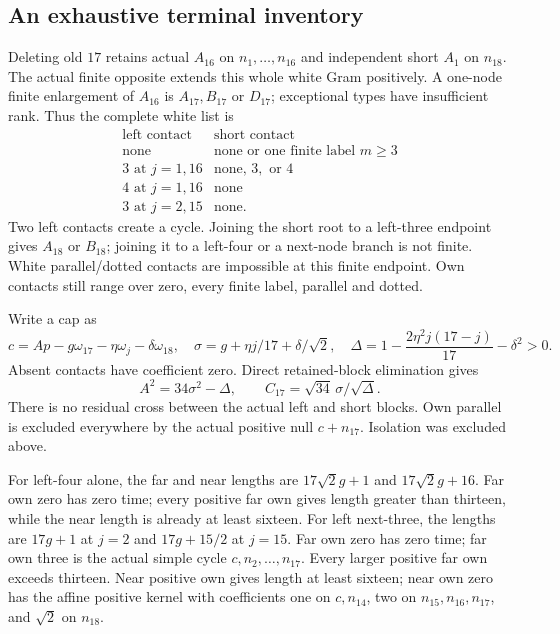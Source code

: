 \documentclass[11pt]{article}
\theoremstyle{definition}
\theoremstyle{remark}
\begin{document}
\subsection{An exhaustive terminal inventory}
\label{app:B18inventory}
Deleting old \(17\) retains actual \(A_{16}\) on
\(n_1,\ldots,n_{16}\) and independent short \(A_1\) on \(n_{18}\).
The actual finite opposite extends this whole white Gram positively.
A one-node finite enlargement of \(A_{16}\) is \(A_{17},B_{17}\)
or \(D_{17}\); exceptional types have insufficient rank.
Thus the complete white list is
\[
\begin{array}{c|l}
\text{left contact}&\text{short contact}\\ \hline
\text{none}&\text{none or one finite label }m\geq3\\
3\text{ at }j=1,16&\text{none, }3,\text{ or }4\\
4\text{ at }j=1,16&\text{none}\\
3\text{ at }j=2,15&\text{none}.
\end{array}
\]
Two left contacts create a cycle. Joining the short root to a
left-three endpoint gives \(A_{18}\) or \(B_{18}\); joining it
to a left-four or a next-node branch is not finite.
White parallel/dotted contacts are impossible at this finite endpoint.
Own contacts still range over zero, every finite label, parallel
and dotted.

Write a cap as
\[
 c=A p-g\omega_{17}-\eta\omega_j-\delta\omega_{18},
\quad
 \sigma=g+\eta j/17+\delta/\sqrt2,\quad
 \Delta=1-\frac{2\eta^2j(17-j)}{17}-\delta^2>0.
\]
Absent contacts have coefficient zero.
Direct retained-block elimination gives
\[
 A^2=34\sigma^2-\Delta,\qquad
 C_{17}=\sqrt{34}\,\sigma/\sqrt\Delta.
\]
There is no residual cross between the actual left and short blocks.
Own parallel is excluded everywhere by the actual positive null
\(c+n_{17}\). Isolation was excluded above.

For left-four alone, the far and near lengths are
\(17\sqrt2g+1\) and \(17\sqrt2g+16\).
Far own zero has zero time; every positive far own gives length
greater than thirteen, while the near length is already at least
sixteen. For left next-three, the lengths are \(17g+1\) at \(j=2\)
and \(17g+15/2\) at \(j=15\). Far own zero has zero time;
far own three is the actual simple cycle
\(c,n_2,\ldots,n_{17}\). Every larger positive far own exceeds
thirteen. Near positive own gives length at least sixteen;
near own zero has the affine positive kernel with coefficients
one on \(c,n_{14}\), two on \(n_{15},n_{16},n_{17}\),
and \(\sqrt2\) on \(n_{18}\).
\end{document}
